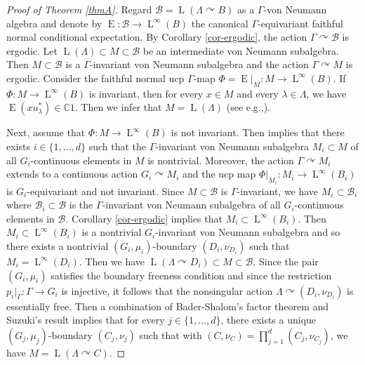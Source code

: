 \documentclass[11pt]{article}
\newcommand{\eg}{e.g.,\xspace}
\theoremstyle{definition}
\newcommand{\C}{\mathbb{C}}
\DeclareMathOperator{\rE}{ E}
\DeclareMathOperator{\rL}{L}
\begin{document}
\begin{proof}[Proof of Theorem \ref{thmA}]
Regard $\mathscr B = \rL(\Lambda \curvearrowright B)$ as a $\Gamma$-von Neumann algebra and denote by $\rE : \mathscr B \to \rL^\infty(B)$ the canonical $\Gamma$-equivariant faithful normal conditional expectation. By Corollary \ref{cor-ergodic}, the action $\Gamma \curvearrowright \mathscr B$ is ergodic. Let $\rL(\Lambda) \subset M \subset \mathscr B$ be an intermediate von Neumann subalgebra. Then $M \subset\mathscr B$ is a $\Gamma$-invariant von Neumann subalgebra and the action $\Gamma \curvearrowright M$ is ergodic. Consider the faithful normal ucp $\Gamma$-map $\Phi = \rE|_M : M \to \rL^\infty(B)$. If $\Phi : M \to \rL^\infty(B)$ is invariant, then for every $x \in M$ and every $\lambda \in \Lambda$, we have $\rE(x u_\lambda^*) \in \C 1$. Then we infer that $M = \rL(\Lambda)$ (see \eg \cite[Cor.\,3.4]{Su18}).

Next, assume that $\Phi : M \to \rL^\infty(B)$ is not invariant. Then \cite[Th.\,5.8]{BBHP20} implies that there exists $i \in \{1, \dots, d\}$ such that the $\Gamma$-invariant von Neumann subalgebra $M_i \subset M$ of all $G_i$-continuous elements in $M$ is nontrivial. Moreover, the action $\Gamma \curvearrowright M_i$ extends to a continuous action $G_i \curvearrowright M_i$ and the ucp map $\Phi|_{M_i} : M_i \to \rL^\infty(B_i)$ is $G_i$-equivariant and not invariant. Since $M \subset \mathscr B$ is $\Gamma$\nobreakdash-in\-vari\-ant, we have $M_i \subset \mathscr B_i$ where $\mathscr B_i \subset \mathscr B$ is the $\Gamma$-invariant von Neumann subalgebra of all $G_i$-continuous elements in $\mathscr B$. Corollary \ref{cor-ergodic} implies that $M_i \subset \rL^\infty(B_i)$. Then $M_i \subset \rL^\infty(B_i)$ is a nontrivial $G_i$-invariant von Neumann subalgebra and so there exists a nontrivial $(G_i, \mu_i)$-boundary $(D_i, \nu_{D_i})$ such that $M_i = \rL^\infty(D_i)$. Then we have $\rL(\Lambda \curvearrowright D_i) \subset M \subset \mathscr B$. Since the pair $(G_i, \mu_i)$ satisfies the boundary freeness condition and since the restriction $p_i |_\Gamma : \Gamma \to G_i$ is injective, it follows that the nonsingular action $\Lambda \curvearrowright (D_i, \nu_{D_i})$ is essentially free. Then a combination of Bader-Shalom's factor theorem \cite[Th.\,1.7]{BS04} and Suzuki's result \cite[Th.\,3.6]{Su18} implies that for every $j \in \{1, \dots, d\}$, there exists a unique $(G_j, \mu_j)$-boundary $(C_j, \nu_j)$ such that with $(C, \nu_C) = \prod_{j = 1}^d (C_j, \nu_{C_j})$, we have $M = \rL(\Lambda \curvearrowright C)$.
\end{proof}
\end{document}
